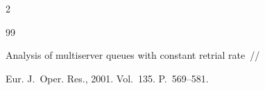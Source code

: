 \begin{multicols}{2}
{{\begin{thebibliography}{99}


Analysis of multiserver queues with constant retrial rate~//


Eur. J.~Oper. Res., 2001. Vol.~135. P.~569--581.


 \end{thebibliography}


}


}








\end{multicols}


